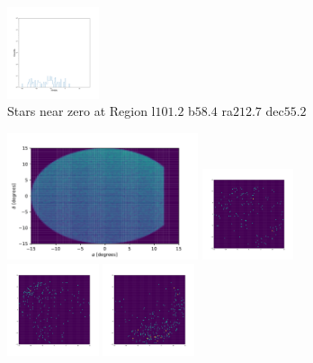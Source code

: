\documentclass[12pt,prd]{article}
\begin{document}
\begin{figure}[h!]
\includegraphics[width=0.24\textwidth]{../figures/stars_near_zero_rahistgaiascan_l101_2_b58_4_ra212_7_dec55_2_npy_17.pdf}
\caption{Stars near zero at Region l$101.2$ b$58.4$ ra$212.7$ dec$55.2$}
\end{figure}

\begin{figure}[h!]
\centering
\includegraphics[width=0.5\textwidth]{../figures/histogram2dgaiascan_l101_2_b58_4_ra212_7_dec55_2_npy.pdf}
\includegraphics[width=0.24\textwidth]{../figures/stars_passing_cutgaiascan_l101_2_b58_4_ra212_7_dec55_2_npy_0.pdf}
\includegraphics[width=0.24\textwidth]{../figures/stars_passing_cutgaiascan_l101_2_b58_4_ra212_7_dec55_2_npy_1.pdf}
\includegraphics[width=0.24\textwidth]{../figures/stars_passing_cutgaiascan_l101_2_b58_4_ra212_7_dec55_2_npy_2.pdf}

\end{figure}
\end{document}
